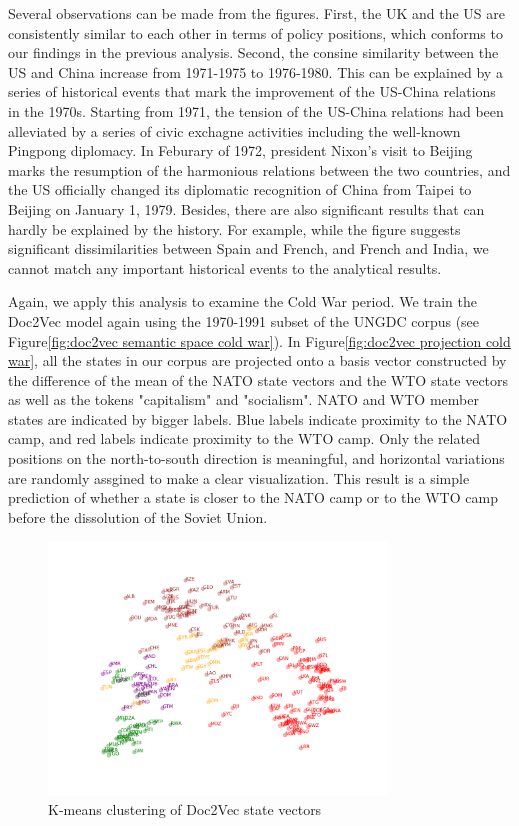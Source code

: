 \documentclass[final,authoryear,3p,12pt,times,hidelinks]{elsarticle}
\begin{document}
Several observations can be made from the figures. First, the UK and the US are consistently similar to each other in terms of policy positions, which conforms to our findings in the previous analysis. Second, the consine similarity between the US and China increase from 1971-1975 to 1976-1980. This can be explained by a series of historical events that mark the improvement of the US-China relations in the 1970s. Starting from 1971, the tension of the US-China relations had been alleviated by a series of civic exchagne activities including the well-known Pingpong diplomacy. In Feburary of 1972, president Nixon's visit to Beijing marks the resumption of the harmonious relations between the two countries, and the US officially changed its diplomatic recognition of China from Taipei to Beijing on January 1, 1979. Besides, there are also significant results that can hardly be explained by the history. For example, while the figure suggests significant dissimilarities between Spain and French, and French and India, we cannot match any important historical events to the analytical results. 

Again, we apply this analysis to examine the Cold War period. We train the Doc2Vec model again using the 1970-1991 subset of the UNGDC corpus (see Figure\ref{fig:doc2vec semantic space cold war}). In Figure\ref{fig:doc2vec projection cold war}, all the states in our corpus are projected onto a basis vector constructed by the difference of the mean of the NATO state vectors and the WTO state vectors as well as the tokens "capitalism" and "socialism". NATO and WTO member states are indicated by bigger labels. Blue labels indicate proximity to the NATO camp, and red labels indicate proximity to the WTO camp. Only the related positions on the north-to-south direction is meaningful, and horizontal variations are randomly assgined to make a clear visualization. This result is a simple prediction of whether a state is closer to the NATO camp or to the WTO camp before the dissolution of the Soviet Union. 

\begin{figure}[ht!]
  \begin{center}
    \includegraphics[width=0.8\textwidth]{graphs/doc2vec_kmeans_clustering.png}
    \caption{K-means clustering of Doc2Vec state vectors}
    \label{fig:doc2vec clustering}
  \end{center}
\end{figure}
\end{document}
